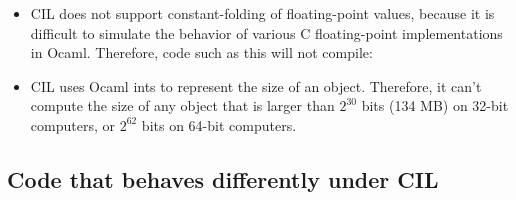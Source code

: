 \documentclass{article}
\begin{document}
\begin{itemize}
\item CIL does not support constant-folding of floating-point values,
  because it is difficult to simulate the behavior of various
  C floating-point implementations in Ocaml.  Therefore, code such as
  this will not compile:

\item CIL uses Ocaml ints to represent the size of an object.
  Therefore, it can't compute the size of any object that is larger
  than $2^{30}$ bits (134 MB) on 32-bit computers, or $2^{62}$ bits on
  64-bit computers.

\end{itemize}

\subsection{Code that behaves differently under CIL}
\end{document}
